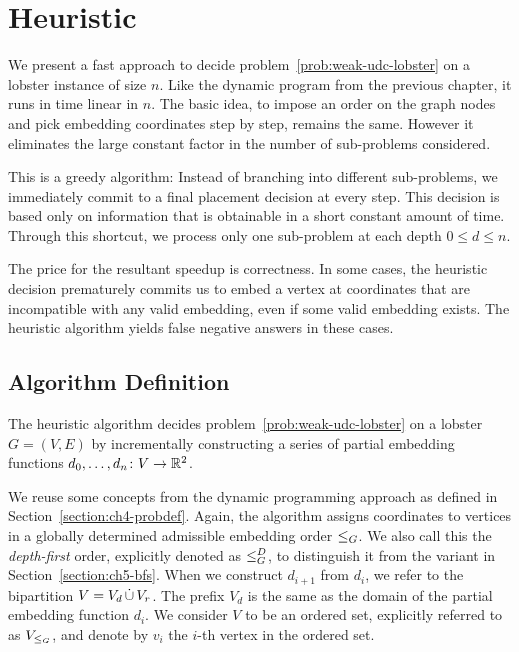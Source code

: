 \chapter{Heuristic}
\label{ch:heuristic}

We present a fast approach to decide problem~\ref{prob:weak-udc-lobster} on a lobster instance of size $n$. Like the dynamic program from the previous chapter, it runs in time linear in $n$. The basic idea, to impose an order on the graph nodes and pick embedding coordinates step by step, remains the same. However it eliminates the large constant factor in the number of sub-problems considered.

This is a greedy algorithm: Instead of branching into different sub-problems, we immediately commit to a final placement decision at every step. This decision is based only on information that is obtainable in a short constant amount of time. Through this shortcut, we process only one sub-problem at each depth $0 \leq d \leq n$.

The price for the resultant speedup is correctness. In some cases, the heuristic decision prematurely commits us to embed a vertex at coordinates that are incompatible with any valid embedding, even if some valid embedding exists. The heuristic algorithm yields false negative answers in these cases.

\section{Algorithm Definition}

The heuristic algorithm decides problem~\ref{prob:weak-udc-lobster} on a lobster $G = (V, E)$ by incrementally constructing a series of partial embedding functions $d_0, \ldots, d_n \colon V \to \mathbb R^2$.

We reuse some concepts from the dynamic programming approach as defined in Section~\ref{section:ch4-probdef}. Again, the algorithm assigns coordinates to vertices in a globally determined admissible embedding order $\leq_G$. We also call this the \emph{depth-first} order, explicitly denoted as $\leq_G^D$, to distinguish it from the variant in Section~\ref{section:ch5-bfs}. When we construct $d_{i+1}$ from $d_i$, we refer to the bipartition $V = V_d \,\dot{\cup}\, V_r$. The prefix $V_d$ is the same as the domain of the partial embedding function $d_i$. We consider $V$ to be an ordered set, explicitly referred to as $V_{\leq_G}$, and denote by $v_i$ the $i$-th vertex in the ordered set.

